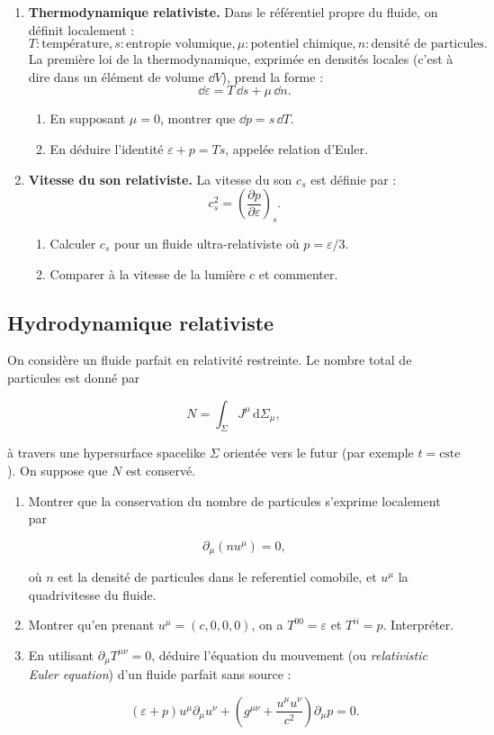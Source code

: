 \documentclass[a4paper,10pt]{report}
\begin{document}
\begin{enumerate}
	\item \textbf{Thermodynamique relativiste.} Dans le référentiel propre du fluide, on définit localement :
	\[
	T : \text{température}, s : \text{entropie volumique}, \mu : \text{potentiel chimique}, n : \text{densité de particules}.
	\]
	La première loi de la thermodynamique, exprimée en densités locales (c'est à dire dans un élément de volume $\dd V$), prend la forme :
	\[
	\dd \varepsilon = T\, \dd s + \mu\, \dd n.
	\]
	\begin{enumerate}
		\item En supposant \( \mu = 0 \), montrer que \( \dd p = s\, \dd T \).
		\item En déduire l'identité \( \varepsilon + p = Ts \), appelée relation d’Euler.
	\end{enumerate}
	
	\item \textbf{Vitesse du son relativiste.} La vitesse du son \( c_s \) est définie par :
	\[
	c_s^2 = \left( \frac{\partial p}{\partial \varepsilon} \right)_s.
	\]
	\begin{enumerate}
		\item Calculer \( c_s \) pour un fluide ultra-relativiste où \( p = \varepsilon / 3 \).
		\item Comparer à la vitesse de la lumière \( c \) et commenter.
	\end{enumerate}
	

\end{enumerate}
\subsection{Hydrodynamique relativiste}
On consid\`ere un fluide parfait en relativité restreinte. Le nombre total de particules est donné par

$$
N = \int_\Sigma J^\mu \, \text{d}\Sigma_{\mu},
$$

\`a travers une hypersurface spacelike $\Sigma$ orientée vers le futur (par exemple $t=\text{cste}$). On suppose que $N$ est conservé.

\begin{enumerate}
	\item Montrer que la conservation du nombre de particules s'exprime localement par
	
	$$
	\partial_\mu(n u^\mu) = 0,
	$$
	
	o\`u $n$ est la densité de particules dans le referentiel comobile, et $u^\mu$ la quadrivitesse du fluide.
	
	
	\item Montrer qu'en prenant $u^\mu = (c,0,0,0)$, on a $T^{00} = \varepsilon$ et $T^{ii} = p$. Interpréter.
	
	\item En utilisant $\partial_\mu T^{\mu\nu} = 0$, déduire l'équation du mouvement (ou \textit{relativistic Euler equation}) d'un fluide parfait sans source :
	
	$$
	(\varepsilon + p) u^\mu \partial_\mu u^\nu + \left(g^{\mu\nu} + \frac{u^\mu u^\nu}{c^2}\right) \partial_\mu p = 0.
	$$
	
\end{enumerate}
\end{document}
